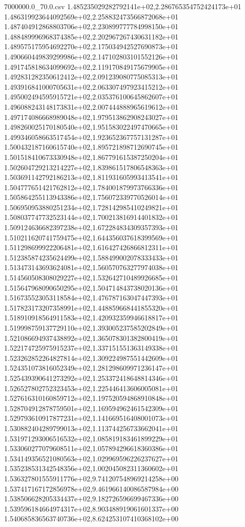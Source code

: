 \begin{filecontents*}{7000000.0_70.0.csv}
1.485235029282792141e+02,2.286765354752424173e+01
1.486319923644092569e+02,2.258832473566872068e+01
1.487404912868803706e+02,2.230899777784998150e+01
1.488489996968374385e+02,2.202967267430631182e+01
1.489575175954692270e+02,2.175034942527690873e+01
1.490660449839299986e+02,2.147102803101552126e+01
1.491745818634099692e+02,2.119170849175679905e+01
1.492831282350612412e+02,2.091239080775085313e+01
1.493916841000705631e+02,2.063307497923415212e+01
1.495002494595915721e+02,2.035376100645862607e+01
1.496088243148173831e+02,2.007444888965619612e+01
1.497174086668989048e+02,1.979513862908243027e+01
1.498260025170180540e+02,1.951583022497470665e+01
1.499346058663517454e+02,1.923652367757131287e+01
1.500432187160615740e+02,1.895721898712690745e+01
1.501518410673330948e+02,1.867791615387250204e+01
1.502604729213214227e+02,1.839861517806548363e+01
1.503691142792186213e+02,1.811931605993413541e+01
1.504777651421762812e+02,1.784001879973766336e+01
1.505864255113943386e+02,1.756072339770526014e+01
1.506950953880251234e+02,1.728142985410249821e+01
1.508037747732523144e+02,1.700213816914401832e+01
1.509124636682397238e+02,1.672284834309357393e+01
1.510211620741759475e+02,1.644356037618399569e+01
1.511298699922206481e+02,1.616427426866812311e+01
1.512385874235624499e+02,1.588499002078333433e+01
1.513473143693624081e+02,1.560570763277974038e+01
1.514560508308029227e+02,1.532642710489926685e+01
1.515647968090650295e+02,1.504714843738020136e+01
1.516735523053118584e+02,1.476787163047447393e+01
1.517823173207358991e+02,1.448859668441855320e+01
1.518910918564911583e+02,1.420932359946618817e+01
1.519998759137729110e+02,1.393005237585202849e+01
1.521086694937438892e+02,1.365078301382800419e+01
1.522174725975915237e+02,1.337151551363149338e+01
1.523262852264827814e+02,1.309224987551442609e+01
1.524351073816052349e+02,1.281298609971236147e+01
1.525439390641273292e+02,1.253372418648814346e+01
1.526527802752323453e+02,1.225446413606005081e+01
1.527616310160859712e+02,1.197520594868910848e+01
1.528704912878759501e+02,1.169594962461542309e+01
1.529793610917877231e+02,1.141669516408001073e+01
1.530882404289799013e+02,1.113744256733662041e+01
1.531971293006516532e+02,1.085819183461899229e+01
1.533060277079608511e+02,1.057894296618360386e+01
1.534149356521080563e+02,1.029969596226237627e+01
1.535238531342548356e+02,1.002045082311360602e+01
1.536327801555911776e+02,9.741207548969214258e+00
1.537417167172856978e+02,9.461966140086587984e+00
1.538506628205334437e+02,9.182726596699467336e+00
1.539596184664974317e+02,8.903488919061601337e+00
1.540685836563740736e+02,8.624253107410368102e+00

\end{filecontents*}
